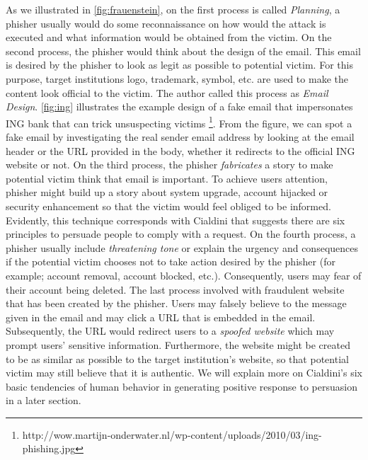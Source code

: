 As we illustrated in \autoref{fig:frauenstein}, on the first process
is called \textit{Planning}, a phisher usually would do some reconnaissance
on how would the attack is executed and what information would be
obtained from the victim. On the second process, the phisher would
think about the design of the email. This email is desired by the
phisher to look as legit as possible to potential victim. For this
purpose, target institutions logo, trademark, symbol, etc. are used
to make the content look official to the victim. The author called
this process as \textit{Email Design}. \autoref{fig:ing} illustrates
the example design of a fake email that impersonates ING bank that
can trick unsuspecting victims%
\footnote{http://wow.martijn-onderwater.nl/wp-content/uploads/2010/03/ing-phishing.jpg%
}. From the figure, we can spot a fake email by investigating the real
sender email address by looking at the email header or the URL provided
in the body, whether it redirects to the official ING website or not.
On the third process, the phisher \textit{fabricates} a story to make
potential victim think that email is important. To achieve users attention,
phisher might build up a story about system upgrade, account hijacked
or security enhancement so that the victim would feel obliged to be
informed. Evidently, this technique corresponds with Cialdini \citep{cialdini:2001}
that suggests there are six principles to persuade people to comply
with a request. On the fourth process, a phisher usually include \textit{threatening
tone} or explain the urgency and consequences if the potential victim
chooses not to take action desired by the phisher (for example; account
removal, account blocked, etc.). Consequently, users may fear of their
account being deleted. The last process involved with fraudulent website
that has been created by the phisher. Users may falsely believe to
the message given in the email and may click a \ac{URL} that is embedded
in the email. Subsequently, the URL would redirect users to a \textit{spoofed
website} which may prompt users\textquoteright{} sensitive information.
Furthermore, the website might be created to be as similar as possible
to the target institution\textquoteright s website, so that potential
victim may still believe that it is authentic. We will explain more
on Cialdini\textquoteright s six basic tendencies of human behavior
in generating positive response to persuasion \citep{cialdini:2001}
in a later section.

